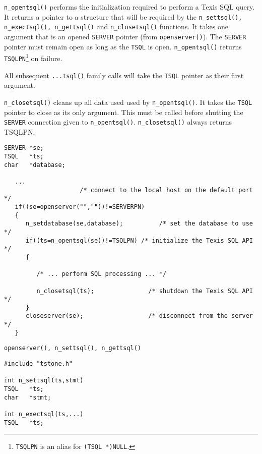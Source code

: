 \DESCRIPTION

\verb`n_opentsql()` performs the initialization required to perform a
Texis SQL query.  It returns a pointer to a structure that will be
required by the \verb`n_settsql(), n_exectsql(), n_gettsql()` and
\verb`n_closetsql()` functions.  It takes one argument that is an opened
\verb`SERVER` pointer (from \verb`openserver()`).  The \verb`SERVER`
pointer must remain open as long as the \verb`TSQL` is open.
\verb`n_opentsql()` returns \verb`TSQLPN`\footnote{\verb`TSQLPN` is an alias
for \verb`(TSQL *)NULL`.} on failure.

All subsequent \verb`...tsql()` family calls will take the \verb`TSQL`
pointer as their first argument.

\verb`n_closetsql()` cleans up all data used used by \verb`n_opentsql()`.
It takes the \verb`TSQL` pointer to close as its only argument.
This must be called before shutting the \verb`SERVER` connection given
to \verb`n_opentsql()`. \verb`n_closetsql()` always returns TSQLPN.

\EXAMPLE
\begin{verbatim}
SERVER *se;
TSQL   *ts;
char   *database;

   ...
                     /* connect to the local host on the default port */
   if((se=openserver("",""))!=SERVERPN)
   {
      n_setdatabase(se,database);          /* set the database to use */
      if((ts=n_opentsql(se))!=TSQLPN) /* initialize the Texis SQL API */
      {

         /* ... perform SQL processing ... */

         n_closetsql(ts);               /* shutdown the Texis SQL API */
      }
      closeserver(se);                  /* disconnect from the server */
   }
\end{verbatim}

\SEE
\begin{verbatim}
openserver(), n_settsql(), n_gettsql()
\end{verbatim}


\SYNOPSIS
\begin{verbatim}
#include "tstone.h"

int n_settsql(ts,stmt)
TSQL   *ts;
char   *stmt;

int n_exectsql(ts,...)
TSQL   *ts;
\end{verbatim}

